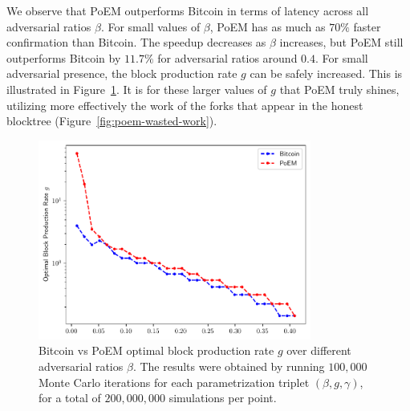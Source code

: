 


%
%


We observe that PoEM outperforms Bitcoin in terms of latency across all adversarial ratios $\beta$.
For small values of $\beta$, PoEM has as much as $70\%$ faster confirmation than Bitcoin.
The speedup decreases as $\beta$ increases, but PoEM still outperforms Bitcoin by $11.7\%$ for adversarial ratios around $0.4$.
For small adversarial presence, the block production rate $g$ can be safely increased. This is illustrated in Figure~\ref{fig:g}.
It is for these larger values of $g$ that PoEM truly shines, utilizing more effectively the work of the
forks that appear in the honest blocktree (Figure~\ref{fig:poem-wasted-work}).

\begin{figure}[h]
    \centering
    \includegraphics[width = 0.8\textwidth]{figures/g.pdf}

    \caption{Bitcoin vs PoEM optimal block production rate $g$ over different adversarial ratios $\beta$.
             The results were obtained by running $100{,}000$ Monte Carlo iterations for each parametrization triplet
             $(\beta, g, \gamma)$, for a total of $200{,}000{,}000$ simulations per point.}
    \label{fig:g}
\end{figure}

